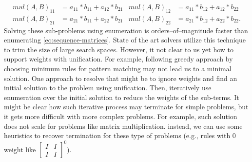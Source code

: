 \begin{description}
%
\begin{align*}
    mul(A,B)_{11} &= a_{11} * b_{11} + a_{12} * b_{21} &
    mul(A,B)_{12} &= a_{11} * b_{12} + a_{12} * b_{22} \\
    mul(A,B)_{21} &= a_{21} * b_{11} + a_{22} * b_{21} &
    mul(A,B)_{22} &= a_{21} * b_{12} + a_{22} * b_{22}. 
\end{align*}
%
Solving these sub-problems using enumeration is orders--of--magnitude faster than enumerating \eqref{eq:sequence-matrices}.
%
State of the art solvers utilize this technique to trim the size of large search spaces.
%
However, it not clear to us yet how to support weights with unification. 
%
For example, following greedy approach by choosing minimum rules for pattern matching may not lead us to a minimal solution. 
%
One approach to resolve that might be to ignore weights and find an initial solution to the problem using unification.
%
Then, iteratively use enumeration over the initial solution to reduce the weights of the sub-terms.
%
It might be clear how such iterative process may terminate for simple problems,
%
but it gets more difficult with more complex problems. 
%
For example, such solution does not scale for problems like matrix multiplication.
%
instead, we can use some heuristics to recover termination for these type of problems (e.g., rules with 0 weight like $\begin{bmatrix} I & I \\ I & I \end{bmatrix}^0$).
\end{description}